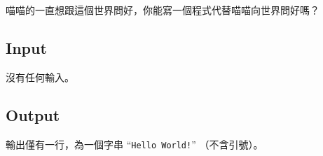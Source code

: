 
喵喵的一直想跟這個世界問好，你能寫一個程式代替喵喵向世界問好嗎？

\subsection*{Input}

沒有任何輸入。

\subsection*{Output}

輸出僅有一行，為一個字串 ``{\tt Hello World!}'' （不含引號）。
